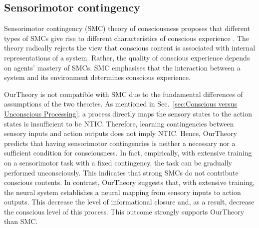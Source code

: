 \documentclass[utf8]{article}
\begin{document}
        



		\subsection{Sensorimotor contingency}
    		Sensorimotor contingency (SMC) theory of consciousness proposes that different types of SMCs give rise to different characteristics of conscious experience \citep{o2001sensorimotor}. The theory radically rejects the view that conscious content is associated with internal representations of a system. Rather, the quality of conscious experience depends on agents' mastery of SMCs. SMC emphasises that the interaction between a system and its environment determines conscious experience. 
    	
    	    \ac{OurTheory} is not compatible with SMC due to the fundamental differences of assumptions of the two theories. As mentioned in Sec.~\ref{sec:Conscious versus Unconscious Processing}, a process directly maps the sensory states to the action states is insufficient to be NTIC. Therefore, learning contingencies between sensory inputs and action outputs does not imply NTIC. Hence, \ac{OurTheory} predicts that having sensorimotor contingencies is neither a necessary nor a sufficient condition for consciousness. In fact, empirically, with extensive training on a sensorimotor task with a fixed contingency, the task can be gradually performed unconsciously. This indicates that strong SMCs do not contribute conscious contents. In contrast, \ac{OurTheory} suggests that, with extensive training, the neural system establishes a neural mapping from sensory inputs to action outputs. This decrease the level of informational closure and, as a result, decrease the conscious level of this process. This outcome strongly supports \ac{OurTheory} than SMC. 
    	    
\end{document}
